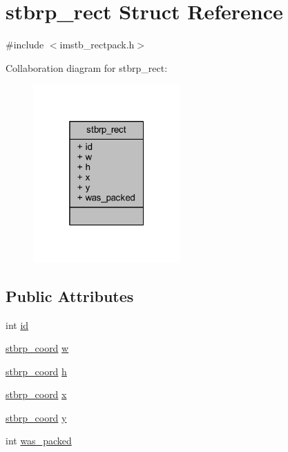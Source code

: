 \hypertarget{structstbrp__rect}{}\section{stbrp\+\_\+rect Struct Reference}
\label{structstbrp__rect}


{\ttfamily \#include $<$imstb\+\_\+rectpack.\+h$>$}



Collaboration diagram for stbrp\+\_\+rect\+:
\nopagebreak
\begin{figure}[H]
\begin{center}
\leavevmode
\includegraphics[width=160pt]{structstbrp__rect__coll__graph}
\end{center}
\end{figure}
\subsection*{Public Attributes}
\begin{DoxyCompactItemize}
\item 
int \mbox{\hyperlink{structstbrp__rect_a92da8626bc99df041c0c3bfd01c25f7a}{id}}
\item 
\mbox{\hyperlink{imstb__rectpack_8h_ac2c2491b95dea6a298b7423dc762dfd9}{stbrp\+\_\+coord}} \mbox{\hyperlink{structstbrp__rect_a248d43f1eb979c1e7b92ba6df431dec5}{w}}
\item 
\mbox{\hyperlink{imstb__rectpack_8h_ac2c2491b95dea6a298b7423dc762dfd9}{stbrp\+\_\+coord}} \mbox{\hyperlink{structstbrp__rect_af68de2dadc7972b7c089d5e0c0558398}{h}}
\item 
\mbox{\hyperlink{imstb__rectpack_8h_ac2c2491b95dea6a298b7423dc762dfd9}{stbrp\+\_\+coord}} \mbox{\hyperlink{structstbrp__rect_a4cc623a3e29f0bc0d3375f6645c84d18}{x}}
\item 
\mbox{\hyperlink{imstb__rectpack_8h_ac2c2491b95dea6a298b7423dc762dfd9}{stbrp\+\_\+coord}} \mbox{\hyperlink{structstbrp__rect_ae3034c1fbf86043b568f5a4dddf946fa}{y}}
\item 
int \mbox{\hyperlink{structstbrp__rect_a74ba347755ce17f2f8a2ea66c612af49}{was\+\_\+packed}}
\end{DoxyCompactItemize}


